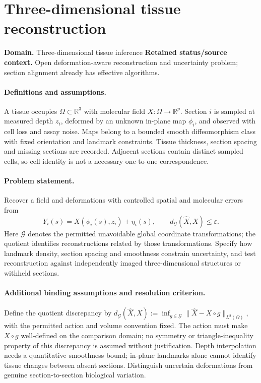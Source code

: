 \documentclass[11pt]{article}
\begin{document}
\section*{Three-dimensional tissue reconstruction}
\label{prob:077}
\label{rank:132}
\par\smallskip

\noindent\textbf{Domain.} Three-dimensional tissue inference \quad \textbf{Retained status/source context.} Open deformation-aware reconstruction and uncertainty problem; section alignment already has effective algorithms.
\paragraph{Definitions and assumptions.} A tissue occupies $\Omega\subset\mathbb{R}^3$ with molecular field $X:\Omega\to\mathbb{R}^p$. Section $i$ is sampled at measured depth $z_i$, deformed by an unknown in-plane map $\phi_i$, and observed with cell loss and assay noise. Maps belong to a bounded smooth diffeomorphism class with fixed orientation and landmark constraints. Tissue thickness, section spacing and missing sections are recorded. Adjacent sections contain distinct sampled cells, so cell identity is not a necessary one-to-one correspondence.
\paragraph{Problem statement.} Recover a field and deformations with controlled spatial and molecular errors from
\[Y_i(s)=X(\phi_i(s),z_i)+\eta_i(s),\qquad d_{\mathcal G}(\widehat X,X)\le\varepsilon.\]
Here $\mathcal G$ denotes the permitted unavoidable global coordinate transformations; the quotient identifies reconstructions related by those transformations. Specify how landmark density, section spacing and smoothness constrain uncertainty, and test reconstruction against independently imaged three-dimensional structures or withheld sections.
\paragraph{Additional binding assumptions and resolution criterion.} Define the quotient discrepancy by $d_{\mathcal G}(\widehat X,X):=\inf_{g\in\mathcal G}\|\widehat X-X\circ g\|_{L^2(\Omega)}$, with the permitted action and volume convention fixed. The action must make $X\circ g$ well-defined on the comparison domain; no symmetry or triangle-inequality property of this discrepancy is assumed without justification. Depth interpolation needs a quantitative smoothness bound; in-plane landmarks alone cannot identify tissue changes between absent sections. Distinguish uncertain deformations from genuine section-to-section biological variation.
\end{document}
